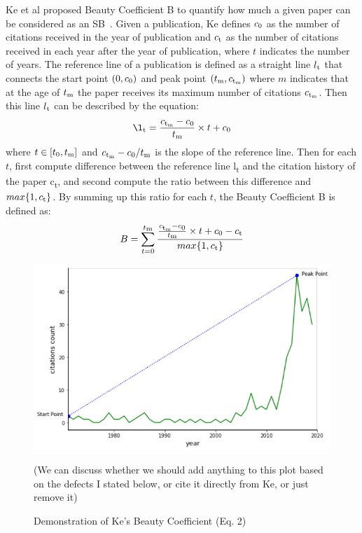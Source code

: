 \documentclass[utf8]{frontiersSCNS}
\begin{document}
Ke et al proposed Beauty Coefficient B to quantify how much a given paper can be considered as an SB~\citep{Ke2015}. Given a publication, Ke defines $c\textsubscript{0}$ as the number of citations received in the year of publication and $c\textsubscript{t}$ as the number of citations received in each year after the year of publication, where $t$ indicates the number of years. The reference line of a publication is defined as a straight line $l\textsubscript{t}$ that connects the start point $(0, c\textsubscript{0})$ and peak point $(t\textsubscript{m}, c\textsubscript{t\textsubscript{m}})$ where $m$ indicates that at the age of $t\textsubscript{m}$ the paper receives its maximum number of citations $c\textsubscript{t\textsubscript{m}}$. Then this line $l\textsubscript{t}$ can be described by the equation:
\begin{equation}
\l\textsubscript{t} = \frac{c\textsubscript{t\textsubscript{m}} - c\textsubscript{0}}{t\textsubscript{m}} \times t + c\textsubscript{0}
\end{equation}
where $t \in [t\textsubscript{0}, t\textsubscript{m}]$ and ${c\textsubscript{t\textsubscript{m}} - c\textsubscript{0}}/{t\textsubscript{m}}$ is the slope of the reference line. Then for each $t$, first compute difference between the reference line l\textsubscript{t} and the citation history of the paper c\textsubscript{t}, and second compute the ratio between this difference and $max\{1, c\textsubscript{t}\}$. By summing up this ratio for each $t$, the Beauty Coefficient B is defined as:
\begin{equation}
B = \sum_{t = 0}^{t\textsubscript{m}} \frac{\frac{c\textsubscript{t\textsubscript{m}} - c\textsubscript{0}}{t\textsubscript{m}} \times t + c\textsubscript{0} - c\textsubscript{t}}{max\{1, c\textsubscript{t}\}}
\end{equation}

\begin{figure}
\begin{center}
\includegraphics{Picture1}
\caption{Demonstration of Ke's Beauty Coefficient (Eq. 2)}\label{fig:1} 
\end{center}
(We can discuss whether we should add anything to this plot based on the defects I stated below, or cite it directly from Ke, or just remove it)
\end{figure}
\end{document}
